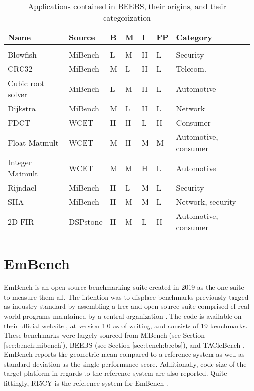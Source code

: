 \documentclass[../bachelor_paper.tex]{subfiles}
\begin{document}
\begin{table}
    \centering
    \caption{Applications contained in BEEBS, their origins, and their categorization \cite{pallisterBEEBSOpenBenchmarks2013}}
    \begin{tabular}{lllllll}
    \textbf{Name}   & \textbf{Source}   & \textbf{B} & \textbf{M} & \textbf{I} & \textbf{FP}    & \textbf{Category} \\
    \hline\\[-0.9em]
    Blowfish        & MiBench   & L & M & H & L & Security \\
    CRC32           & MiBench   & M & L & H & L & Telecom. \\
    Cubic root solver & MiBench & L & M & H & L & Automotive \\
    Dijkstra        & MiBench   & M & L & H & L & Network  \\
    FDCT            & WCET      & H & H & L & H & Consumer \\
    Float Matmult   & WCET      & M & H & M & M & Automotive, consumer \\
    Integer Matmult & WCET      & M & M & H & L & Automotive \\
    Rijndael        & MiBench   & H & L & M & L & Security \\
    SHA             & MiBench   & H & M & M & L & Network, security \\
    2D FIR          & DSPstone  & H & M & L & H & Automotive, consumer \\
    \hline
    \end{tabular}
    \label{tab:bench/beebs/apps}
\end{table}

\section{EmBench}
EmBench is an open source benchmarking suite created in 2019 as the one suite to measure them all. The intention was to displace benchmarks previously tagged as industry standard by assembling a free and open-source suite comprised of real world programs maintained by a central organization \cite{jun11EmbenchRecruitingLong2019}. The code is available on their official website \cite{EmbenchModernEmbedded}, at version 1.0 as of writing, and consists of 19 benchmarks. These benchmarks were largely sourced from MiBench \cite{guthausMiBenchFreeCommercially2001} (see Section \ref{sec:bench:mibench}), BEEBS \cite{pallisterBEEBSOpenBenchmarks2013} (see Section \ref{sec:bench:beebs}), and TACleBench \cite{falkTACLeBenchBenchmarkCollection2016}. EmBench reports the geometric mean compared to a reference system as well as standard deviation as the single performance score. Additionally, code size of the target platform in regards to the reference system are also reported. Quite fittingly, RI5CY is the reference system for EmBench \cite{jun11EmbenchRecruitingLong2019}.
\end{document}
